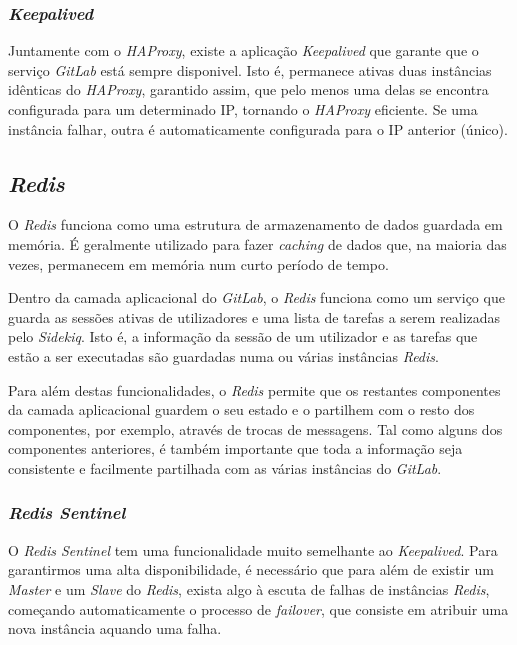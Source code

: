 \documentclass[12pt,a4paper]{article}
\begin{document}
\subsubsection{\emph{Keepalived}}

Juntamente com o \emph{HAProxy}, existe a aplicação \emph{Keepalived} que garante que o serviço \emph{GitLab} está sempre disponivel. Isto é, permanece ativas duas instâncias idênticas do \emph{HAProxy}, garantido assim, que pelo menos uma delas se encontra configurada para um determinado IP, tornando o \emph{HAProxy} eficiente. Se uma instância falhar, outra é automaticamente configurada para o IP anterior (único).



\subsection{\emph{Redis}}

O \emph{Redis} funciona como uma estrutura de armazenamento de dados guardada em memória. É geralmente utilizado para fazer \emph{caching} de dados que, na maioria das vezes, permanecem em memória num curto período de tempo.

Dentro da camada aplicacional do \emph{GitLab}, o \emph{Redis} funciona como um serviço que guarda as sessões ativas de utilizadores e uma lista de tarefas a serem realizadas pelo \emph{Sidekiq}. Isto é, a informação da sessão de um utilizador e as tarefas que estão a ser executadas são guardadas numa ou várias instâncias \emph{Redis}.

Para além destas funcionalidades, o \emph{Redis} permite que os restantes componentes da camada aplicacional guardem o seu estado e o partilhem com o resto dos componentes, por exemplo, através de trocas de messagens. Tal como alguns dos componentes anteriores, é também importante que toda a informação seja consistente e facilmente partilhada com as várias instâncias do \emph{GitLab}.

\subsubsection{\emph{Redis Sentinel}}

O \emph{Redis Sentinel} tem uma funcionalidade muito semelhante ao \emph{Keepalived}. Para garantirmos uma alta disponibilidade, é necessário que para além de existir um \emph{Master} e um \emph{Slave} do \emph{Redis}, exista algo à escuta de falhas de instâncias \emph{Redis}, começando automaticamente o processo de \emph{failover}, que consiste em atribuir uma nova instância aquando uma falha.
\end{document}

